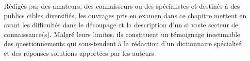 \documentclass[output=paper,colorlinks,citecolor=brown,arabicfont,chinesefont,booklanguage=french]{langscibook}
\begin{document}
\begin{otherlanguage}{french}
Rédigés par des amateurs, des connaisseurs ou des spécialistes et destinés à des publics cibles diversifiés, les ouvrages pris en examen dans ce chapitre mettent en avant les difficultés dans le découpage et la description d’un si vaste secteur de connaissance(s). Malgré leurs limites, ils constituent un témoignage inestimable des questionnements qui sous-tendent à la rédaction d’un dictionnaire spécialisé et des réponses-solutions apportées par les auteurs.

{\sloppy\printbibliography[heading=subbibliography,notkeyword=this]}
\end{otherlanguage}
\end{document}
